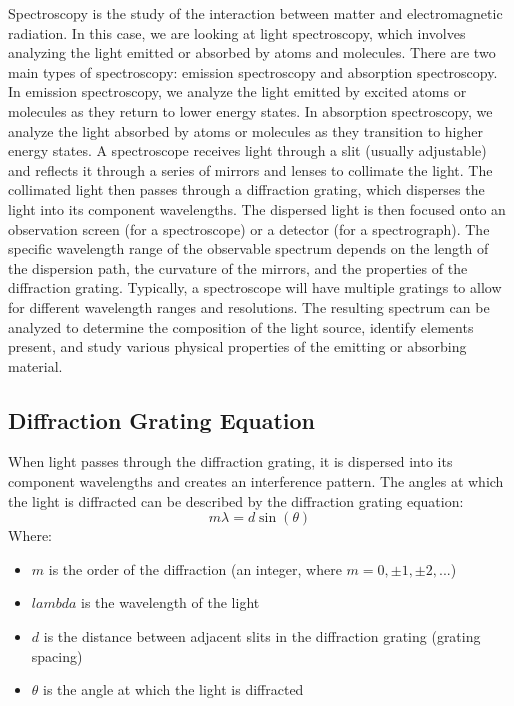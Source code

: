 \documentclass[11pt]{article}
\begin{document}
    Spectroscopy is the study of the interaction between matter and
    electromagnetic radiation.
    In this case, we are looking at light spectroscopy, which involves
    analyzing the light emitted or absorbed by atoms and molecules.
    There are two main types of spectroscopy: emission spectroscopy and
    absorption spectroscopy.
    In emission spectroscopy, we analyze the light emitted by excited atoms or
    molecules as they return to lower energy states.
    In absorption spectroscopy, we analyze the light absorbed by atoms or
    molecules as they transition to higher energy states.
    A spectroscope receives light through a slit (usually adjustable) and
    reflects it through a series of mirrors and lenses to collimate the light.
    The collimated light then passes through a diffraction grating, which
    disperses the light into its component wavelengths.
    The dispersed light is then focused onto an observation screen (for a
    spectroscope) or a detector (for a spectrograph).
    The specific wavelength range of the observable spectrum depends on the
    length of the dispersion path, the curvature of the mirrors, and the
    properties of the diffraction grating.
    Typically, a spectroscope will have multiple gratings to allow for
    different wavelength ranges and resolutions.
    The resulting spectrum can be analyzed to determine the composition of the
    light source, identify elements present, and study various physical
    properties of the emitting or absorbing material.

    \subsection*{Diffraction Grating Equation}

    When light passes through the diffraction grating, it is dispersed into its component wavelengths and creates an interference pattern. The angles at which the light is diffracted can be described by the diffraction grating equation:
    \[
        m\lambda = d \sin(\theta)
    \]
    Where:
    \begin{itemize}
        \item \( m \) is the order of the diffraction (an integer, where \( m = 0, \pm 1, \pm 2, ... \))
        \item \( lambda \) is the wavelength of the light
        \item \( d \) is the distance between adjacent slits in the diffraction grating (grating spacing)
        \item \( \theta \) is the angle at which the light is diffracted
    \end{itemize}
\end{document}
